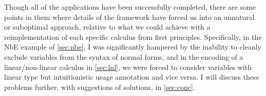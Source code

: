 Though all of the applications have been successfully completed, there are some
points in them where details of the framework have forced us into an unnatural
or suboptimal approach, relative to what we could achieve with a
reimplementation of each specific calculus from first principles.
Specifically, in the NbE example of \cref{sec:nbe}, I was significantly hampered
by the inability to cleanly exclude variables from the syntax of normal forms,
and in the encoding of a linear/non-linear calculus in \cref{sec:lnl}, we were
forced to consider variables with linear type but intuitionistic usage
annotation and vice versa.
I will discuss these problems further, with suggestions of solutions, in
\cref{sec:conc}.
